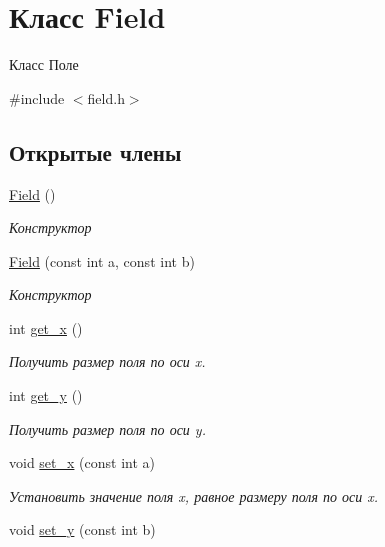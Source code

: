 \hypertarget{classField}{\section{Класс Field}
\label{classField}
}


Класс Поле  




{\ttfamily \#include $<$field.\+h$>$}

\subsection*{Открытые члены}
\begin{DoxyCompactItemize}
\item 
\hypertarget{classField_a3e804c92273d9159f413f227b535c672}{\hyperlink{classField_a3e804c92273d9159f413f227b535c672}{Field} ()}\label{classField_a3e804c92273d9159f413f227b535c672}

\begin{DoxyCompactList}\small\item\em Конструктор \end{DoxyCompactList}\item 
\hyperlink{classField_aa667d9f9aa147e2e01d67622b20f9b8a}{Field} (const int a, const int b)
\begin{DoxyCompactList}\small\item\em Конструктор \end{DoxyCompactList}\item 
int \hyperlink{classField_a87883594a355f7f8d5855a75a9c244ba}{get\+\_\+x} ()
\begin{DoxyCompactList}\small\item\em Получить размер поля по оси x. \end{DoxyCompactList}\item 
int \hyperlink{classField_a88d72b613ec5a84ed771b30c9332a2ee}{get\+\_\+y} ()
\begin{DoxyCompactList}\small\item\em Получить размер поля по оси y. \end{DoxyCompactList}\item 
\hypertarget{classField_aabb859d9fe4221518a4e46a6a53e0ce3}{void \hyperlink{classField_aabb859d9fe4221518a4e46a6a53e0ce3}{set\+\_\+x} (const int a)}\label{classField_aabb859d9fe4221518a4e46a6a53e0ce3}

\begin{DoxyCompactList}\small\item\em Установить значение поля x, равное размеру поля по оси x. \end{DoxyCompactList}\item 
\hypertarget{classField_a44b4baffd21a4e55b4e13456068f1482}{void \hyperlink{classField_a44b4baffd21a4e55b4e13456068f1482}{set\+\_\+y} (const int b)}\label{classField_a44b4baffd21a4e55b4e13456068f1482}


\end{DoxyCompactItemize}

